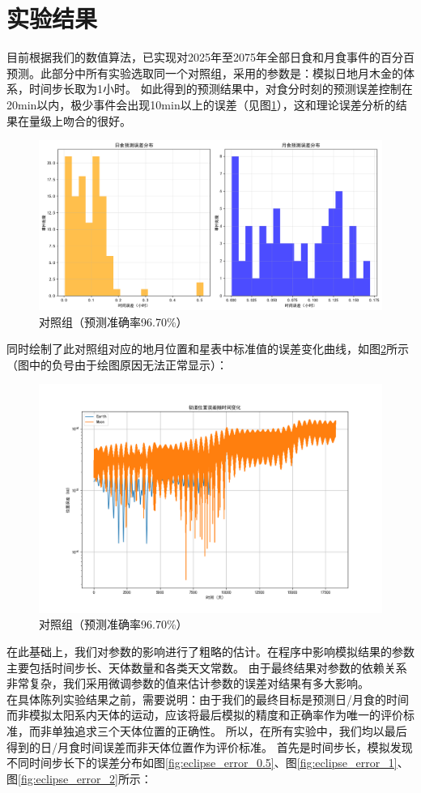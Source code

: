 \documentclass[hidelinks]{article}
\begin{document}
\section{实验结果}

目前根据我们的数值算法，已实现对2025年至2075年全部日食和月食事件的百分百预测。此部分中所有实验选取同一个对照组，采用的参数是：模拟日地月木金的体系，时间步长取为1小时。
如此得到的预测结果中，对食分时刻的预测误差控制在20min以内，极少事件会出现10min以上的误差（见图\ref{fig:eclipse_error}），这和理论误差分析的结果在量级上吻合的很好。

\begin{figure}[h]
    \centering
    \includegraphics[width=0.5\linewidth]{images/error_distribution_1.png}
    \caption{对照组（预测准确率96.70\%）}
    \label{fig:eclipse_error}
\end{figure}

同时绘制了此对照组对应的地月位置和星表中标准值的误差变化曲线，如图\ref{fig:position_error}所示（图中的负号由于绘图原因无法正常显示）：

\begin{figure}[h]
    \centering
    \includegraphics[width=0.5\linewidth]{images/position_errors.png}
    \caption{对照组（预测准确率96.70\%）}
    \label{fig:position_error}
\end{figure}

在此基础上，我们对参数的影响进行了粗略的估计。在程序中影响模拟结果的参数主要包括时间步长、天体数量和各类天文常数。
由于最终结果对参数的依赖关系非常复杂，我们采用微调参数的值来估计参数的误差对结果有多大影响。\\
在具体陈列实验结果之前，需要说明：由于我们的最终目标是预测日/月食的时间而非模拟太阳系内天体的运动，应该将最后模拟的精度和正确率作为唯一的评价标准，而非单独追求三个天体位置的正确性。
所以，在所有实验中，我们均以最后得到的日/月食时间误差而非天体位置作为评价标准。
首先是时间步长，模拟发现不同时间步长下的误差分布如图\ref{fig:eclipse_error_0.5}、图\ref{fig:eclipse_error_1}、图\ref{fig:eclipse_error_2}所示：
\end{document}
